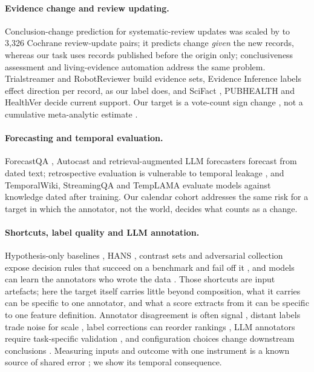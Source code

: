 \documentclass[11pt]{article}
\begin{document}
\paragraph{Evidence change and review updating.} Conclusion-change prediction for systematic-review
updates \citep{Bashir2019,Bashir2021} was scaled by \citet{AlharbiStevenson2026} to 3{,}326 Cochrane
review-update pairs; it predicts change \emph{given} the new records, whereas our task uses
records published before the origin only; conclusiveness assessment \citep{Ban2026} and
living-evidence automation \citep{Song2026,Harasgama2026} address the same problem. Trialstreamer \citep{Marshall2020} and RobotReviewer
\citep{Marshall2015} build evidence sets, Evidence Inference \citep{Lehman2019,DeYoung2020} labels
effect direction per record, as our label does, and SciFact
\citep{Wadden2020SciFact}, PUBHEALTH \citep{Kotonya2020PubHealth} and HealthVer
\citep{Sarrouti2021HealthVer} decide current support. Our target is a vote-count sign change
\citep{HedgesOlkin1980}, not a cumulative meta-analytic estimate
\citep{Lau1992,Pogue1997,Wetterslev2008}.

\paragraph{Forecasting and temporal evaluation.} ForecastQA \citep{Jin2021ForecastQA}, Autocast
\citep{Zou2022Autocast} and retrieval-augmented LLM forecasters \citep{Halawi2024} forecast from
dated text; retrospective evaluation is vulnerable to temporal leakage \citep{Paleka2025}, and TemporalWiki,
StreamingQA and TempLAMA \citep{Jang2022TemporalWiki,Liska2022StreamingQA,Dhingra2022TempLAMA,Lazaridou2021}
evaluate models against knowledge dated after training. Our calendar cohort addresses the same risk
for a target in which the annotator, not the world, decides what counts as a change.

\paragraph{Shortcuts, label quality and LLM annotation.} Hypothesis-only baselines \citep{Gururangan2018,Poliak2018},
HANS \citep{McCoy2019}, contrast sets \citep{Gardner2020} and adversarial collection
\citep{Nie2020} expose decision rules that succeed on a benchmark and fail off it
\citep{Geirhos2020}, and models can learn the annotators who wrote the data \citep{Geva2019}. Those
shortcuts are input artefacts; here the target itself carries little beyond
composition, what it carries can be specific to one annotator, and what a score extracts from it
can be specific to one feature definition.
Annotator disagreement is often signal \citep{Pavlick2019,Plank2022}, distant labels trade
noise for scale \citep{Mintz2009}, label corrections can reorder rankings \citep{Northcutt2021}, LLM annotators require task-specific
validation \citep{Gilardi2023,Ziems2024,Pangakis2023}, and configuration choices change
downstream conclusions \citep{Baumann2025}. Measuring inputs and outcome with one instrument is a known
source of shared error \citep{Podsakoff2003}; we show its temporal consequence.
\end{document}
